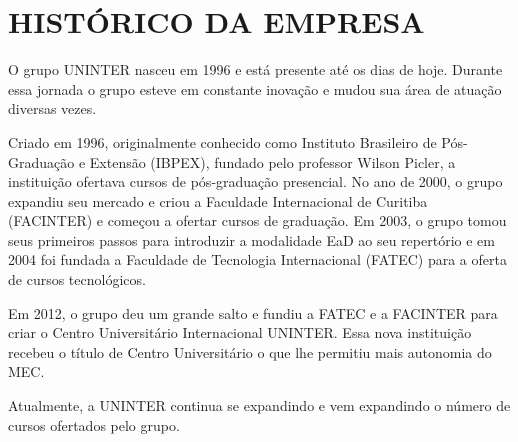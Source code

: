 \section{HISTÓRICO DA EMPRESA}
O grupo UNINTER nasceu em 1996 e está presente até os dias de hoje.
Durante essa jornada o grupo esteve em constante inovação e mudou sua área de atuação diversas vezes.

Criado em 1996, originalmente conhecido como Instituto Brasileiro de Pós-Graduação e Extensão (IBPEX), fundado pelo professor Wilson Picler, a instituição ofertava cursos de pós-graduação presencial.
No ano de 2000, o grupo expandiu seu mercado e criou a Faculdade Internacional de Curitiba (FACINTER) e começou a ofertar cursos de graduação.
Em 2003, o grupo tomou seus primeiros passos para introduzir a modalidade EaD ao seu repertório e em 2004 foi fundada a Faculdade de Tecnologia Internacional (FATEC) para a oferta de cursos tecnológicos.

Em 2012, o grupo deu um grande salto e fundiu a FATEC e a FACINTER para criar o  Centro Universitário Internacional UNINTER.
Essa nova instituição recebeu o título de Centro Universitário o que lhe permitiu mais autonomia do MEC.

Atualmente, a UNINTER continua se expandindo e vem expandindo o número de cursos ofertados pelo grupo.
